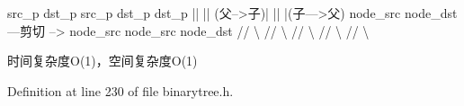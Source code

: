 {\ttfamily 
\begin{DoxyPre}
                src\_p         dst\_p                                    src\_p         dst\_p             dst\_p
                  ||            ||                               (父-->子)|             ||                |(子--->父)
                node\_src     node\_dst         ---剪切 -->               node\_src      node\_src        node\_dst
                //   \textbackslash{}      //    \textbackslash{}                                 //     \textbackslash{}      //     \textbackslash{}        //     \textbackslash{}
\end{DoxyPre}
} 时间复杂度\+O(1)，空间复杂度\+O(1) 

Definition at line 230 of file binarytree.\+h.

